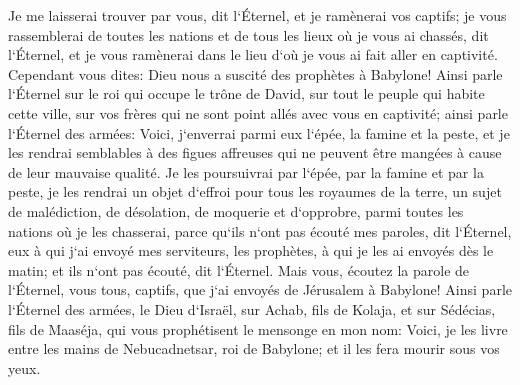 \verse Je me laisserai trouver par vous, dit l`Éternel, et je ramènerai vos captifs; je vous rassemblerai de toutes les nations et de tous les lieux où je vous ai chassés, dit l`Éternel, et je vous ramènerai dans le lieu d`où je vous ai fait aller en captivité. 
\verse Cependant vous dites: Dieu nous a suscité des prophètes à Babylone! 
\verse Ainsi parle l`Éternel sur le roi qui occupe le trône de David, sur tout le peuple qui habite cette ville, sur vos frères qui ne sont point allés avec vous en captivité; 
\verse ainsi parle l`Éternel des armées: Voici, j`enverrai parmi eux l`épée, la famine et la peste, et je les rendrai semblables à des figues affreuses qui ne peuvent être mangées à cause de leur mauvaise qualité. 
\verse Je les poursuivrai par l`épée, par la famine et par la peste, je les rendrai un objet d`effroi pour tous les royaumes de la terre, un sujet de malédiction, de désolation, de moquerie et d`opprobre, parmi toutes les nations où je les chasserai, 
\verse parce qu`ils n`ont pas écouté mes paroles, dit l`Éternel, eux à qui j`ai envoyé mes serviteurs, les prophètes, à qui je les ai envoyés dès le matin; et ils n`ont pas écouté, dit l`Éternel. 
\verse Mais vous, écoutez la parole de l`Éternel, vous tous, captifs, que j`ai envoyés de Jérusalem à Babylone! 
\verse Ainsi parle l`Éternel des armées, le Dieu d`Israël, sur Achab, fils de Kolaja, et sur Sédécias, fils de Maaséja, qui vous prophétisent le mensonge en mon nom: Voici, je les livre entre les mains de Nebucadnetsar, roi de Babylone; et il les fera mourir sous vos yeux. 
